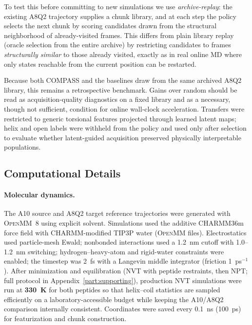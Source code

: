 To test this before committing to new simulations we use \emph{archive-replay}: the existing A8Q2 trajectory supplies a chunk library, and at each step the policy selects the next chunk by scoring candidates drawn from the structural neighborhood of already-visited frames.
This differs from plain library replay (oracle selection from the entire archive) by restricting candidates to frames \emph{structurally similar} to those already visited, exactly as in real online MD where only states reachable from the current position can be restarted.

Because both COMPASS and the baselines draw from the same archived A8Q2 library, this remains a retrospective benchmark.
Gains over random should be read as acquisition-quality diagnostics on a fixed library and as a necessary, though not sufficient, condition for online wall-clock acceleration.
Transfers were restricted to generic torsional features projected through learned latent maps; helix and open labels were withheld from the policy and used only after selection to evaluate whether latent-guided acquisition preserved physically interpretable populations.

\subsection{Computational Details}

\paragraph{Molecular dynamics.}
The A10 source and A8Q2 target reference trajectories were generated with \textsc{OpenMM}~8\cite{eastman2024openmm8} using explicit solvent.
Simulations used the additive CHARMM36m force field with CHARMM-modified TIP3P water (\textsc{OpenMM}  files).\cite{huang2017charmm36m,kim2015charmmgui}
Electrostatics used particle-mesh Ewald; nonbonded interactions used a 1.2~nm cutoff with 1.0--1.2~nm switching; hydrogen--heavy-atom and rigid-water constraints were enabled; the timestep was 2~fs with a Langevin middle integrator (friction 1~ps$^{-1}$).
After minimization and equilibration (NVT with peptide restraints, then NPT; full protocol in Appendix~\ref{part:supporting}), production NVT simulations were run at \textbf{330~K} for both peptides so that helix--coil statistics are sampled efficiently on a laboratory-accessible budget while keeping the A10/A8Q2 comparison internally consistent.
Coordinates were saved every 0.1~ns (100~ps) for featurization and chunk construction.

